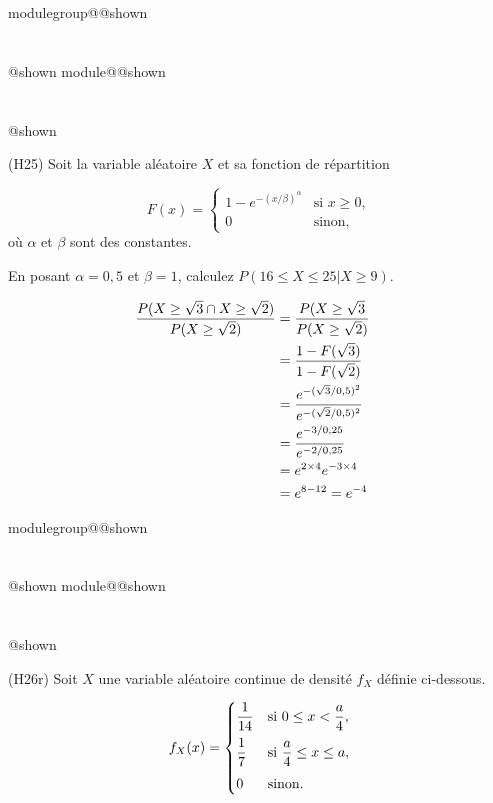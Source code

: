 \documentclass{Evaluation}
\makeatletter
\newcommand{\currentmodulekey}{}
\newcommand{\currentmoduletitle}{}
\newcommand{\currentgroupkey}{}
\newcommand{\currentgrouptitle}{}
\newcommand{\showmoduleifneeded}{%
  \ifx\currentgroupkey\empty\else
    \expandafter\ifx\csname modulegroup@\currentgroupkey @shown\endcsname\relax
      \section*{\currentgrouptitle}%
      \expandafter\gdef\csname modulegroup@\currentgroupkey @shown\endcsname{1}%
    \fi
  \fi
  \expandafter\ifx\csname module@\currentmodulekey @shown\endcsname\relax
    \section*{\currentmoduletitle}%
    \expandafter\gdef\csname module@\currentmodulekey @shown\endcsname{1}%
  \fi
}
\newenvironment{H25}{\showmoduleifneeded}{}
\newenvironment{H26r}{\showmoduleifneeded}{}
\makeatother
\begin{document}
\begin{questions}
\begin{H25}
\question
(H25) Soit la variable aléatoire $X$ et sa fonction de répartition

\[ F(x) =
\begin{cases}
   \displaystyle 1-e^{-(x/\beta)^\alpha}& \text{si } x \ge 0, \\
    0 & \text{sinon},
\end{cases}
\]
où $\alpha$ et $\beta$ sont des constantes.

En posant $\alpha = 0,5$ et $\beta=1$, calculez $P(16 \leq X \leq 25 | X\geq 9)$.

\begin{solution}
    \begin{align*}
        \frac{P(X \geq \sqrt{3} \cap X \geq \sqrt{2})}{P(X \geq \sqrt{2})}
        &= \frac{P(X \geq \sqrt{3} }{P(X \geq \sqrt{2})} \cr
        &=\frac{1-F(\sqrt{3})}{1-F(\sqrt{2})} \cr
        &=\frac{e^{-(\sqrt{3}/0,5)^2}}{e^{-(\sqrt{2}/0,5)^2}}\cr
        &= \frac{e^{-3/0,25}}{e^{-2/0,25}} \cr
        &= e^{2 \times 4}e^{-3\times 4} \cr
        &= e^{8-12} = e^{-4}
    \end{align*}
\end{solution}
\end{H25}

\begin{H26r}
\question
(H26r) Soit $X$ une variable aléatoire continue de densité $f_X$ définie ci-dessous.

\begin{minipage}[]{7cm}{
\vspace{0cm}
\[ f_X(x) = \begin{cases}
\vspace{0.2cm}
\displaystyle \frac{1}{14} & \mbox{si } 0\leq x < \displaystyle \frac{a}{4}, \\
\vspace{0.2cm}
\displaystyle \frac{1}{7} & \mbox{si } \displaystyle\frac{a}{4}\leq x \leq \displaystyle a, \\
\displaystyle 0 & \mbox{sinon.}
\end{cases} \]
    }
\end{minipage}
 \hspace{10mm}
\begin{minipage}[]{7cm}{
\vspace{0cm}
}
\end{minipage}
\end{H26r}
\end{questions}
\end{document}
